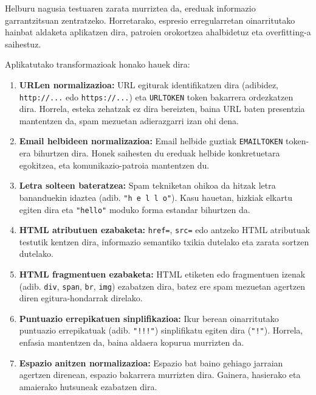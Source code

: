 \documentclass[12pt, a4paper]{article}
\begin{document}
Helburu nagusia testuaren zarata murriztea da, ereduak informazio garrantzitsuan zentratzeko. Horretarako, espresio erregularretan oinarritutako hainbat aldaketa aplikatzen dira, patroien orokortzea ahalbidetuz eta overfitting-a saihestuz.

Aplikatutako transformazioak honako hauek dira:

\begin{enumerate}
\item \textbf{URLen normalizazioa:} URL egiturak identifikatzen dira (adibidez, \texttt{http://...} edo \texttt{https://...}) eta \texttt{URLTOKEN} token bakarrera ordezkatzen dira. Horrela, esteka zehatzak ez dira bereizten, baina URL baten presentzia mantentzen da, spam mezuetan adierazgarri izan ohi dena.

\item \textbf{Email helbideen normalizazioa:} Email helbide guztiak \texttt{EMAILTOKEN} token-era bihurtzen dira. Honek saihesten du ereduak helbide konkretuetara egokitzea, eta komunikazio-patroia mantentzen du.

\item \textbf{Letra solteen bateratzea:} Spam tekniketan ohikoa da hitzak letra bananduekin idaztea (adib. \texttt{"h e l l o"}). Kasu hauetan, hizkiak elkartu egiten dira eta \texttt{"hello"} moduko forma estandar bihurtzen da.

\item \textbf{HTML atributuen ezabaketa:} \texttt{href=}, \texttt{src=} edo antzeko HTML atributuak testutik kentzen dira, informazio semantiko txikia dutelako eta zarata sortzen dutelako.

\item \textbf{HTML fragmentuen ezabaketa:} HTML etiketen edo fragmentuen izenak (adib. \texttt{div}, \texttt{span}, \texttt{br}, \texttt{img}) ezabatzen dira, batez ere spam mezuetan agertzen diren egitura-hondarrak direlako.

\item \textbf{Puntuazio errepikatuen sinplifikazioa:} Ikur berean oinarritutako puntuazio errepikatuak (adib. \texttt{"!!!"}) sinplifikatu egiten dira (\texttt{"!"}). Horrela, enfasia mantentzen da, baina aldaera kopurua murrizten da.

\item \textbf{Espazio anitzen normalizazioa:} Espazio bat baino gehiago jarraian agertzen direnean, espazio bakarrera murrizten dira. Gainera, hasierako eta amaierako hutsuneak ezabatzen dira.
\end{enumerate}
\end{document}
